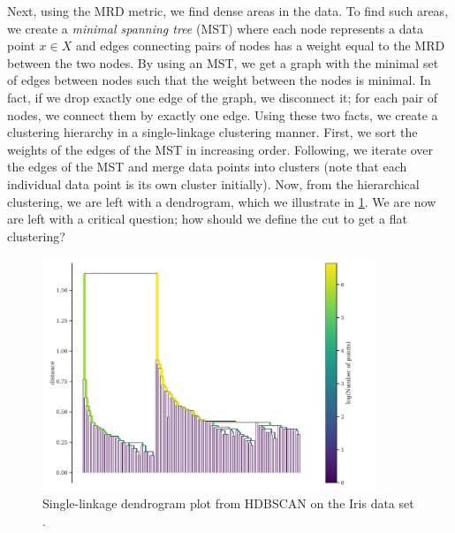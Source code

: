 Next, using the MRD metric, we find dense areas in the data. To find such areas, we create a \textit{minimal spanning tree} (MST) where each node represents a data point $x \in X$ and edges connecting pairs of nodes has a weight equal to the MRD between the two nodes. By using an MST, we get a graph with the minimal set of edges between nodes such that the weight between the nodes is minimal. In fact, if we drop exactly one edge of the graph, we disconnect it; for each pair of nodes, we connect them by exactly one edge. Using these two facts, we create a clustering hierarchy in a single-linkage clustering manner. First, we sort the weights of the edges of the MST in increasing order. Following, we iterate over the edges of the MST and merge data points into clusters (note that each individual data point is its own cluster initially). Now, from the hierarchical clustering, we are left with a dendrogram, which we illustrate in \cref{fig:hdbscan-dendrogram-example}. We are now are left with a critical question; how should we define the cut to get a flat clustering?
\begin{figure}[H]
    \centering
    \includegraphics[width=10cm]{thesis/figures/hdbscan-single-linage-tree-example.pdf}
    \caption{Single-linkage dendrogram plot from HDBSCAN on the Iris data set \cite{Fisher1936}.}
    \label{fig:hdbscan-dendrogram-example}
\end{figure}

